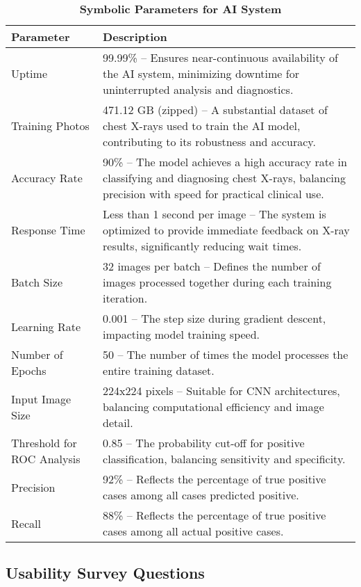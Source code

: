 \documentclass[12pt, titlepage]{article}
\begin{document}
\begin{enumerate}
\begin{enumerate}
\begin{enumerate}
\begin{table}[H]
  \centering
  \noindent
  \begin{tabular}{|p{3.5cm}|p{9.5cm}|}
      \hline
      \rowcolor{lightgray} \textbf{Parameter} & \textbf{Description} \\
      \hline
      Uptime & 99.99\% – Ensures near-continuous availability of the AI system, minimizing downtime for uninterrupted analysis and diagnostics. \\
      \hline
      Training Photos & 471.12 GB (zipped) – A substantial dataset of chest X-rays used to train the AI model, contributing to its robustness and accuracy. \\
      \hline
      Accuracy Rate & 90\% – The model achieves a high accuracy rate in classifying and diagnosing chest X-rays, balancing precision with speed for practical clinical use. \\
      \hline
      Response Time & Less than 1 second per image – The system is optimized to provide immediate feedback on X-ray results, significantly reducing wait times. \\
      \hline
      Batch Size & 32 images per batch – Defines the number of images processed together during each training iteration. \\
      \hline
      Learning Rate & 0.001 – The step size during gradient descent, impacting model training speed. \\
      \hline
      Number of Epochs & 50 – The number of times the model processes the entire training dataset. \\
      \hline
      Input Image Size & 224x224 pixels – Suitable for CNN architectures, balancing computational efficiency and image detail. \\
      \hline
      Threshold for ROC Analysis & 0.85 – The probability cut-off for positive classification, balancing sensitivity and specificity. \\
      \hline
      Precision & 92\% – Reflects the percentage of true positive cases among all cases predicted positive. \\
      \hline
      Recall & 88\% – Reflects the percentage of true positive cases among all actual positive cases. \\
      \hline
  \end{tabular}
  \caption{\textbf{Symbolic Parameters for AI System}}
\end{table}


\subsection{Usability Survey Questions}


\end{enumerate}
\end{enumerate}
\end{enumerate}
\end{document}
